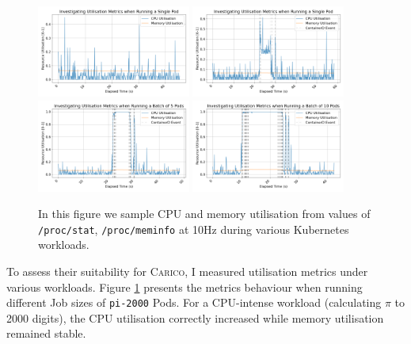 \begin{figure}[H]
    \centering
    \includegraphics[width=0.45\textwidth]{images/utilisation-baseline.png}
    \includegraphics[width=0.45\textwidth]{images/utilisation-single.png} \\
    \includegraphics[width=0.45\textwidth]{images/utilisation-smallbatch.png}
    \includegraphics[width=0.45\textwidth]{images/utilisation-bigbatch.png}
    \caption{In this figure we sample CPU and memory utilisation from
    values of \texttt{/proc/stat}, \texttt{/proc/meminfo} at 10Hz during various
    Kubernetes workloads.}
    \label{fig:utilisation-eval}
\end{figure}

To assess their suitability for \textsc{Carico}, I measured utilisation metrics
under various workloads. Figure \ref{fig:utilisation-eval} presents the metrics
behaviour when running different Job sizes of \verb|pi-2000| Pods. For a
CPU-intense workload (calculating $\pi$ to 2000 digits), the CPU utilisation
correctly increased while memory utilisation remained stable.

